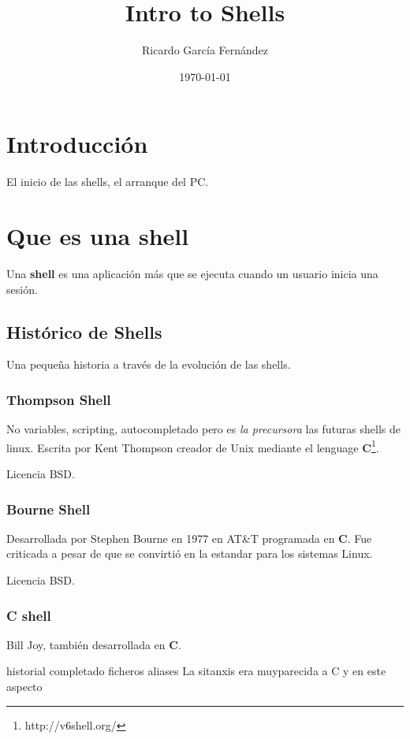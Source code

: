 \documentclass{scrartcl}
\title{\textbf{Intro to Shells}}
\subtitle{}
\author{Ricardo Garc\'ia Fern\'andez}
\date{\today}
\begin{document}
\maketitle

\section{Introducci\'on}

El inicio de las shells, el arranque del PC.

\section{Que es una shell}

Una \textbf{shell} es una aplicaci\'on m\'as que se ejecuta cuando un usuario inicia una sesi\'on.

\subsection{Hist\'orico de Shells}

Una peque\~na historia a trav\'es de la evoluci\'on de las shells.

\subsubsection{Thompson Shell}

No variables, scripting, autocompletado pero es \emph{la precursora} las futuras shells de linux.
Escrita por Kent Thompson creador de Unix mediante el lenguage \textbf{C}\footnote{http://v6shell.org/}.

Licencia BSD.

\subsubsection{Bourne Shell}

Desarrollada por Stephen Bourne en 1977 en AT\&T programada en \textbf{C}.
Fue criticada a pesar de que se convirti\'o en la estandar para los sistemas Linux.

Licencia BSD.

\subsubsection{C shell}

Bill Joy, tambi\'en desarrollada en \textbf{C}.

historial
completado ficheros
aliases
La sitanxis era muyparecida a C y en este aspecto 
\end{document}
